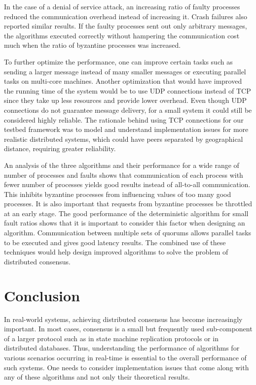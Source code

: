 In the case of a denial of service attack, an increasing ratio of faulty processes reduced the communication overhead instead of increasing it. Crash failures also reported similar results. If the faulty processes sent out only arbitrary messages, the algorithms executed correctly without hampering the communication cost much when the ratio of byzantine processes was increased.

To further optimize the performance, one can improve certain tasks such as sending a larger message instead of many smaller messages or executing parallel tasks on multi-core machines. Another optimization that would have improved the running time of the system would be to use UDP connections instead of TCP since they take up less resources and provide lower overhead. Even though UDP connections do not guarantee message delivery, for a small system it could still be considered highly reliable. The rationale behind using TCP connections for our testbed framework was to model and understand implementation issues for more realistic distributed systems, which could have peers separated by geographical distance, requiring greater reliability. 

An analysis of the three algorithms and their performance for a wide range of number of processes and faults shows that communication of each process with fewer number of processes yields good results instead of all-to-all communication. This inhibits byzantine processes from influencing values of too many good processes. It is also important that requests from byzantine processes be throttled at an early stage. The good performance of the deterministic algorithm for small fault ratios shows that it is important to consider this factor when designing an algorithm.  Communication between multiple sets of quorums allows parallel tasks to be executed and gives good latency results. The combined use of these techniques would help design improved algorithms to solve the problem of distributed consensus. 



\section{Conclusion}
\label{sec:conc}
In real-world systems, achieving distributed consensus has become increasingly important. In most cases, consensus is a small but frequently used sub-component of a larger protocol such as in state machine replication protocols or in distributed databases. Thus, understanding the performance of algorithms for various scenarios occurring in real-time is essential to the overall performance of such systems. One needs to consider implementation issues that come along with any of these algorithms and not only their theoretical results. 

